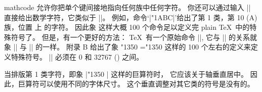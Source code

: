 \ddanger mathcode 允许你把单个键间接地指向任何族中任何字符。%
你还可以通过输入 |\mathchar| 直接给出数学字符，它类似于 |\char|。%
例如，命令`|\mathchar"1ABC|'给出了第 1 类，第 10 (\hex A) 族，位置  上%
的字符。%
因此象
\begintt
\def\sum{\mathchar"1350 }
\endtt
这样大概 100 个命令足以定义完 plain \TeX\ 中的特殊符号了。%
但是，有一个更好的方法： \TeX\ 有一个原始命令 |\mathchardef|,
它与 |\mathchar| 的关系就象 |\chardef| 与 |\char| 的一样。%
附录 B 给出了象
\begintt
\mathchardef\sum="1350
\endtt
这样的 100 个左右的定义来定义特殊符号。%
|\mathchar| 必须在 0 和 32767 () 之间。

\ddanger 当排版第 1 类字符，即象 |\sum| 这样的巨算符时，
它应该关于轴垂直居中。%
因此，巨算符可以使用不同的字体尺寸。%
这个垂直调整对其它类的符号是没有的。

